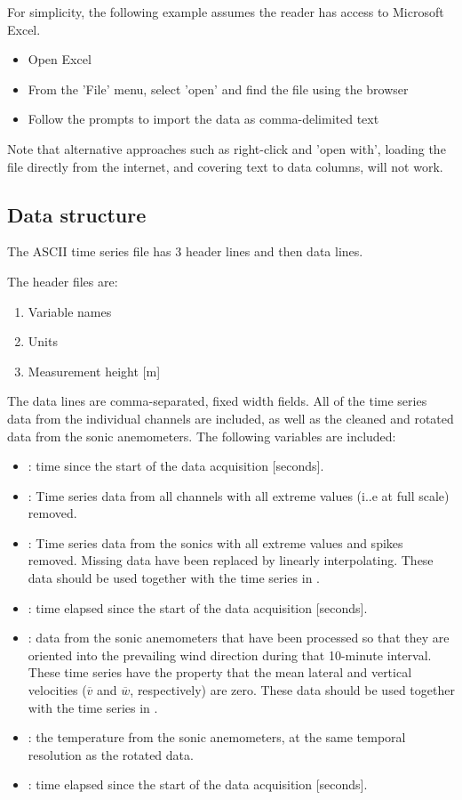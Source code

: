 For simplicity, the following example assumes the reader has access to Microsoft Excel.
\begin{itemize}
\item Open Excel
\item From the 'File' menu, select 'open' and find the file using the browser
\item Follow the prompts to import the data as comma-delimited text
\end{itemize}

Note that alternative approaches such as right-click and 'open with', loading the file directly from the internet, and covering text to data columns, will not work.

\subsection{Data structure}
The ASCII time series file has 3 header lines and then data lines. 

The header files are:
\begin{enumerate}
\item Variable names
\item Units
\item Measurement height [m]
\end{enumerate}

The data lines are comma-separated, fixed width fields. All of the time series data from the individual channels are included, as well as the cleaned and rotated data from the sonic anemometers. The following variables are included:

\begin{itemize}
\item {}: time since the start of the data acquisition [seconds].
\item {}: Time series data from all channels with all extreme values (i..e at full scale) removed.
\item {}: Time series data from the sonics with all extreme values and spikes removed. Missing data have been replaced by linearly interpolating. These data should be used together with the time series in .
\item {}: time elapsed since the start of the data acquisition [seconds].
\item {}: data from the sonic anemometers that have been processed so that they are oriented into the prevailing wind direction during that 10-minute interval. These time series have the property that the mean lateral and vertical velocities ($\overline{v}$ and $\overline{w}$, respectively) are zero. These data should be used together with the time series in .
\item {}: the temperature from the sonic anemometers, at the same temporal resolution as the rotated data.
\item {}: time elapsed since the start of the data acquisition [seconds].
\end{itemize}